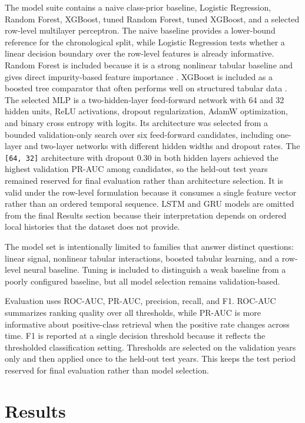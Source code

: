 \documentclass{article}
\begin{document}
The model suite contains a naive class-prior baseline, Logistic Regression, Random Forest, XGBoost, tuned Random Forest, tuned XGBoost, and a selected row-level multilayer perceptron. The naive baseline provides a lower-bound reference for the chronological split, while Logistic Regression tests whether a linear decision boundary over the row-level features is already informative. Random Forest is included because it is a strong nonlinear tabular baseline and gives direct impurity-based feature importance \citep{breiman2001random}. XGBoost is included as a boosted tree comparator that often performs well on structured tabular data \citep{chen2016xgboost}. The selected MLP is a two-hidden-layer feed-forward network with 64 and 32 hidden units, ReLU activations, dropout regularization, AdamW optimization, and binary cross entropy with logits. Its architecture was selected from a bounded validation-only search over six feed-forward candidates, including one-layer and two-layer networks with different hidden widths and dropout rates. The \texttt{[64, 32]} architecture with dropout 0.30 in both hidden layers achieved the highest validation PR-AUC among candidates, so the held-out test years remained reserved for final evaluation rather than architecture selection. It is valid under the row-level formulation because it consumes a single feature vector rather than an ordered temporal sequence. LSTM and GRU models are omitted from the final Results section because their interpretation depends on ordered local histories that the dataset does not provide.

The model set is intentionally limited to families that answer distinct questions: linear signal, nonlinear tabular interactions, boosted tabular learning, and a row-level neural baseline. Tuning is included to distinguish a weak baseline from a poorly configured baseline, but all model selection remains validation-based.

Evaluation uses ROC-AUC, PR-AUC, precision, recall, and F1. ROC-AUC summarizes ranking quality over all thresholds, while PR-AUC is more informative about positive-class retrieval when the positive rate changes across time. F1 is reported at a single decision threshold because it reflects the thresholded classification setting. Thresholds are selected on the validation years only and then applied once to the held-out test years. This keeps the test period reserved for final evaluation rather than model selection.

\section{Results}
\end{document}
